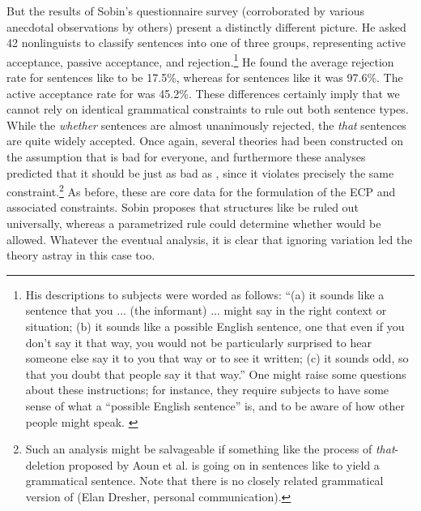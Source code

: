 \noindent
But the results of Sobin's questionnaire survey (corroborated by various anecdotal observations by others) present a distinctly different picture. He asked 42 nonlinguists to classify sentences into one of three groups, representing active acceptance, passive acceptance, and rejection.\footnote{His descriptions to subjects were worded as follows: ``(a) it sounds like a sentence that you
... (the informant) ... might say in the right context or situation; (b) it sounds like a possible English sentence, one that even if you don't say it that way, you would not be particularly surprised to hear someone else say it to you that way or to see it written; (c) it sounds odd, so that you doubt that people say it that way.'' One might raise some questions about these instructions; for instance, they require subjects to have some sense of what a ``possible English sentence'' is, and to be aware of how other people might speak. \label{fn:2:17}
}
 He found the average rejection rate for sentences like  to be 17.5\%, whereas for sentences like  it was 97.6\%. The active acceptance rate for  was 45.2\%. These differences certainly imply that we cannot rely on identical grammatical constraints to rule out both sentence types. While the \textit{whether} sentences are almost unanimously rejected, the \textit{that} sentences are quite widely accepted. Once again, several theories had been constructed on the assumption that  is bad for everyone, and furthermore these analyses predicted that it should be just as bad as , since it violates precisely the same constraint.\footnote{Such an analysis might be salvageable if something like the process of \textit{that}-deletion proposed by Aoun et al. is going on in sentences like  to yield a grammatical sentence. Note that there is no closely related grammatical version of  (Elan Dresher, personal communication).}
 As before, these are core data for the formulation of the ECP and associated constraints. Sobin proposes that structures like  be ruled out universally, whereas a parametrized rule could determine whether  would be allowed. Whatever the eventual analysis, it is clear that ignoring variation led the theory astray in this case too.

